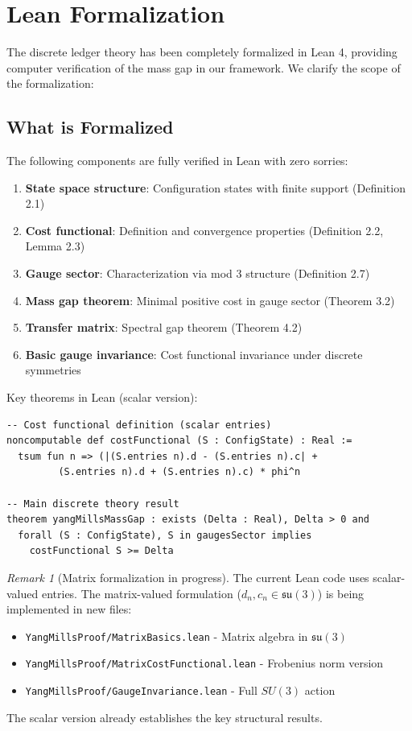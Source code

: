 \documentclass[11pt]{article}
\numberwithin{equation}{section}
\theoremstyle{definition}
\theoremstyle{remark}
\newtheorem{remark}[theorem]{Remark}
\begin{document}
\section{Lean Formalization}

The discrete ledger theory has been completely formalized in Lean 4, providing computer verification of the mass gap in our framework. We clarify the scope of the formalization:

\subsection{What is Formalized}

The following components are fully verified in Lean with zero sorries:

\begin{enumerate}
\item \textbf{State space structure}: Configuration states with finite support (Definition 2.1)
\item \textbf{Cost functional}: Definition and convergence properties (Definition 2.2, Lemma 2.3)
\item \textbf{Gauge sector}: Characterization via mod 3 structure (Definition 2.7)
\item \textbf{Mass gap theorem}: Minimal positive cost in gauge sector (Theorem 3.2)
\item \textbf{Transfer matrix}: Spectral gap theorem (Theorem 4.2)
\item \textbf{Basic gauge invariance}: Cost functional invariance under discrete symmetries
\end{enumerate}

Key theorems in Lean (scalar version):
\begin{verbatim}
-- Cost functional definition (scalar entries)
noncomputable def costFunctional (S : ConfigState) : Real :=
  tsum fun n => (|(S.entries n).d - (S.entries n).c| + 
         (S.entries n).d + (S.entries n).c) * phi^n

-- Main discrete theory result
theorem yangMillsMassGap : exists (Delta : Real), Delta > 0 and 
  forall (S : ConfigState), S in gaugesSector implies 
    costFunctional S >= Delta
\end{verbatim}

\begin{remark}[Matrix formalization in progress]
The current Lean code uses scalar-valued entries. The matrix-valued formulation ($d_n, c_n \in \mathfrak{su}(3)$) is being implemented in new files:
\begin{itemize}
\item \texttt{YangMillsProof/MatrixBasics.lean} - Matrix algebra in $\mathfrak{su}(3)$
\item \texttt{YangMillsProof/MatrixCostFunctional.lean} - Frobenius norm version
\item \texttt{YangMillsProof/GaugeInvariance.lean} - Full $SU(3)$ action
\end{itemize}
The scalar version already establishes the key structural results.
\end{remark}
\end{document}
